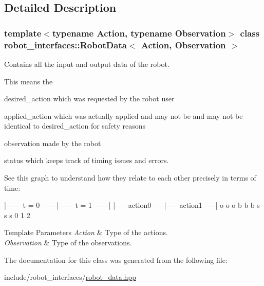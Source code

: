 \subsection{Detailed Description}
\subsubsection*{template$<$typename Action, typename Observation$>$\newline
class robot\+\_\+interfaces\+::\+Robot\+Data$<$ Action, Observation $>$}

Contains all the input and output data of the robot. 

This means the
\begin{DoxyItemize}
\item {\ttfamily desired\+\_\+action} which was requested by the robot user
\item {\ttfamily applied\+\_\+action} which was actually applied and may not be and may not be identical to desired\+\_\+action for safety reasons
\item {\ttfamily observation} made by the robot
\item {\ttfamily status} which keeps track of timing issues and errors.
\end{DoxyItemize}

See this graph to understand how they relate to each other precisely in terms of time\+:

\begin{DoxyVerb}|------ t = 0 ------|------ t = 1 ------|
|----- action0 -----|----- action1 -----|
o                   o                   o
b                   b                   b
s                   s                   s
0                   1                   2
\end{DoxyVerb}



\begin{DoxyTemplParams}{Template Parameters}
{\em Action} & Type of the actions. \\
\hline
{\em Observation} & Type of the observations. \\
\hline
\end{DoxyTemplParams}


The documentation for this class was generated from the following file\+:\begin{DoxyCompactItemize}
\item 
include/robot\+\_\+interfaces/\hyperlink{robot__data_8hpp}{robot\+\_\+data.\+hpp}\end{DoxyCompactItemize}
